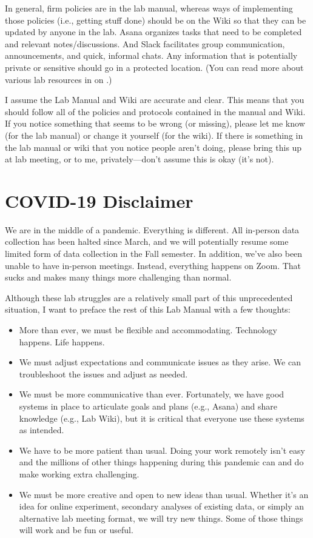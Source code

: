 \documentclass[letterpaper,11pt,oneside]{memoir}
\begin{document}
In general, firm policies are in the lab manual, whereas ways of implementing those policies (i.e., getting stuff done) should be on the Wiki so that they can be updated by anyone in the lab. Asana organizes tasks that need to be completed and relevant notes/discussions. And Slack facilitates group communication, announcements, and quick, informal chats. Any information that is potentially private or sensitive should go in a protected location. (You can read more about various lab resources in  on .)

\begin{shaded}
\noindent I assume the Lab Manual and Wiki are accurate and clear. This means that you should follow all of the policies and protocols contained in the manual and Wiki. If you notice something that seems to be wrong (or missing), please let me know (for the lab manual) or change it yourself (for the wiki). If there is something in the lab manual or wiki that you notice people aren't doing, please bring this up at lab meeting, or to me, privately---don't assume this is okay (it's not).
\end{shaded}

\chapter{COVID-19 Disclaimer} 
We are in the middle of a pandemic. Everything is different. All in-person data collection has been halted since March, and we will potentially resume some limited form of data collection in the Fall semester. In addition, we've also been unable to have in-person meetings. Instead, everything happens on Zoom. That sucks and makes many things more challenging than normal. 

Although these lab struggles are a relatively small part of this unprecedented situation, I want to preface the rest of this Lab Manual with a few thoughts: 

\begin{itemize}
\item More than ever, we must be flexible and accommodating. Technology happens. Life happens. 
\item We must adjust expectations and communicate issues as they arise. We can troubleshoot the issues and adjust as needed.
\item We must be more communicative than ever. Fortunately, we have good systems in place to articulate goals and plans (e.g., Asana) and share knowledge (e.g., Lab Wiki), but it is critical that everyone use these systems as intended.
\item We have to be more patient than usual. Doing your work remotely isn't easy and the millions of other things happening during this pandemic can and do make working extra challenging. 
\item We must be more creative and open to new ideas than usual. Whether it's an idea for online experiment, secondary analyses of existing data, or simply an alternative lab meeting format, we will try new things. Some of those things will work and be fun or useful. 
\end{itemize}
\end{document}
